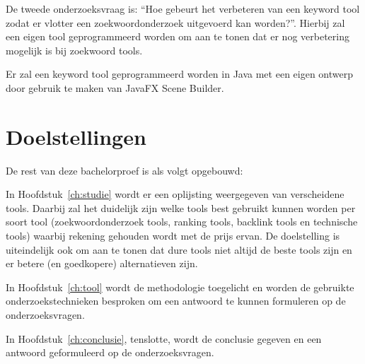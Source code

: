 De tweede onderzoeksvraag is: “Hoe gebeurt het verbeteren van een keyword tool zodat er vlotter een zoekwoordonderzoek uitgevoerd kan worden?”. Hierbij zal een eigen tool geprogrammeerd worden om aan te tonen dat er nog verbetering mogelijk is bij zoekwoord tools. 

Er zal een keyword tool geprogrammeerd worden in Java met een eigen ontwerp door gebruik te maken van JavaFX Scene Builder. 


\section{Doelstellingen}
\label{sec:doelstellingen}


De rest van deze bachelorproef is als volgt opgebouwd:

In Hoofdstuk~\ref{ch:studie} wordt er een oplijsting  weergegeven van verscheidene tools. Daarbij zal het duidelijk zijn welke tools best gebruikt kunnen worden per soort tool (zoekwoordonderzoek tools, ranking tools, backlink tools en technische tools) waarbij rekening gehouden wordt met de prijs ervan. De doelstelling is uiteindelijk ook om aan te tonen dat dure tools niet altijd de beste tools zijn en er betere (en goedkopere) alternatieven zijn. 

In Hoofdstuk~\ref{ch:tool} wordt de methodologie toegelicht en worden de gebruikte onderzoekstechnieken besproken om een antwoord te kunnen formuleren op de onderzoeksvragen.


In Hoofdstuk~\ref{ch:conclusie}, tenslotte, wordt de conclusie gegeven en een antwoord geformuleerd op de onderzoeksvragen. 


